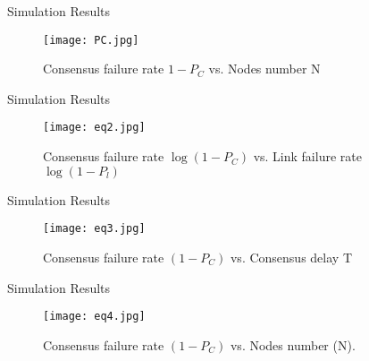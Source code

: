 \documentclass{beamer}
\begin{document}
\begin{frame}{Simulation Results}
\begin{figure}
    \centering
    \texttt{[image: PC.jpg]}
    \caption{Consensus failure rate $1-P_C$ vs. Nodes number N}
\end{figure}


\end{frame}
\begin{frame}{Simulation Results}
\begin{figure}
    \centering
    \texttt{[image: eq2.jpg]}
    \caption{Consensus failure rate $\log(1-P_C)$ vs. Link failure rate $\log(1-P_l)$}
\end{figure}


\end{frame}


\begin{frame}{Simulation Results}
\begin{figure}
    \centering
    \texttt{[image: eq3.jpg]}
    \caption{Consensus failure rate $(1 - P_C)$ vs. Consensus delay T}
\end{figure}


\end{frame}


\begin{frame}{Simulation Results}
\begin{figure}
    \centering
    \texttt{[image: eq4.jpg]}
    \caption{Consensus failure rate $(1 - P_C)$ vs. Nodes number (N).}
\end{figure}

\end{frame}
\end{document}
